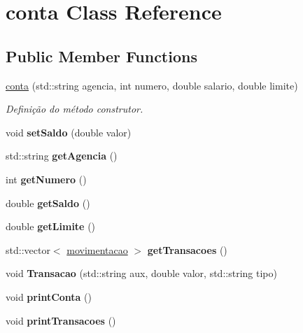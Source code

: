\hypertarget{classconta}{}\section{conta Class Reference}
\label{classconta}
\subsection*{Public Member Functions}
\begin{DoxyCompactItemize}
\item 
\mbox{\hyperlink{classconta_ae1ae229747e7746c07ba63a442f4e32a}{conta}} (std\+::string agencia, int numero, double salario, double limite)
\begin{DoxyCompactList}\small\item\em Definição do método construtor. \end{DoxyCompactList}\item 
\mbox{\label{classconta_a1653e3753698d02fe0bfcfdc3301ff5c}} 
void {\bfseries set\+Saldo} (double valor)
\item 
\mbox{\label{classconta_ad4f5c632b73ee60998134998572ef84d}} 
std\+::string {\bfseries get\+Agencia} ()
\item 
\mbox{\label{classconta_a819fb9e7799572a2c0dec38c99535877}} 
int {\bfseries get\+Numero} ()
\item 
\mbox{\label{classconta_a6fe329855fbe72be943ac41252074e86}} 
double {\bfseries get\+Saldo} ()
\item 
\mbox{\label{classconta_a90eb992b9d9ea3ad16544320485b84c1}} 
double {\bfseries get\+Limite} ()
\item 
\mbox{\label{classconta_a729c6bf15d4483baa63e0044c435d901}} 
std\+::vector$<$ \mbox{\hyperlink{classmovimentacao}{movimentacao}} $>$ {\bfseries get\+Transacoes} ()
\item 
\mbox{\label{classconta_a179d06e5ce3c11ecef79d24ed7446754}} 
void {\bfseries Transacao} (std\+::string aux, double valor, std\+::string tipo)
\item 
\mbox{\label{classconta_aa8a70d2a97179aa2a580ca17007e2c5d}} 
void {\bfseries print\+Conta} ()
\item 
\mbox{\label{classconta_a40fb7a725ecf0ce46bf822523e633e77}} 
void {\bfseries print\+Transacoes} ()
\end{DoxyCompactItemize}


